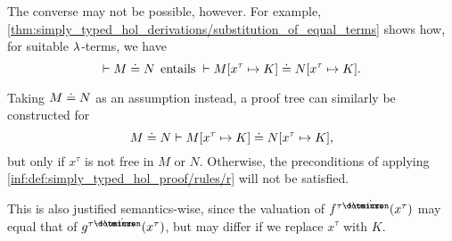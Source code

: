 \begin{remark}
  The converse may not be possible, however. For example, \cref{thm:simply_typed_hol_derivations/substitution_of_equal_terms} shows how, for suitable \( {\mathrm \lambda} \)-terms, we have
  \begin{equation*}
    \vdash M \syneq N \thinspace \T{entails} {}\vdash M[x^\tau \mapsto K] \syneq N[x^\tau \mapsto K].
  \end{equation*}

  Taking \( M \doteq N \) as an assumption instead, a proof tree can similarly be constructed for
  \begin{equation*}
    M \doteq N \vdash M[x^\tau \mapsto K] \doteq N[x^\tau \mapsto K],
  \end{equation*}
  but only if \( x^\tau \) is not free in \( M \) or \( N \). Otherwise, the preconditions of applying \ref{inf:def:simply_typed_hol_proof/rules/r} will not be satisfied.

  This is also justified semantics-wise, since the valuation of \( f^{\tau \synimplies \syn\omicron}(x^\tau) \) may equal that of \( g^{\tau \synimplies \syn\omicron}(x^\tau) \), but may differ if we replace \( x^\tau \) with \( K \).
\end{remark}

